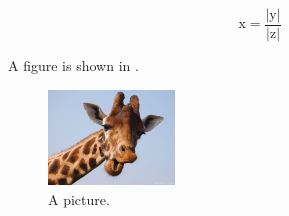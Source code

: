 \begin{equation}    
\mathrm{x = \frac{\displaystyle |y|}{\displaystyle |z|}}
\label{eqn:ecommon}
\end{equation}

A figure is shown in .

\begin{figure}[h!]
  \centering
  \includegraphics[width=0.3\textwidth]{figure/giraffe.jpg}
  \caption{A picture.}
  \label{fig:fcommon} 
\end{figure}
